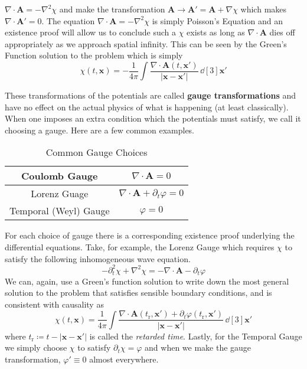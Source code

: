 \(\nabla\cdot\mathbf{A} = -\nabla^2\chi\) and make the transformation
\(\mathbf{A}\to\mathbf{A}'=\mathbf{A} + \nabla\chi\) which makes
\(\nabla\cdot\mathbf{A}' = 0\). The equation \(\nabla\cdot\mathbf{A} = -\nabla^2\chi\)
is simply Poisson's Equation and an existence proof will allow us to conclude
such a \(\chi\) exists as long as \(\nabla\cdot\mathbf{A}\) dies off
appropriately as we approach spatial infinity. This can be seen by the Green's
Function solution to the problem which is simply
\begin{equation*}
    \chi(t, \mathbf{x}) = -\frac{1}{4\pi}\int \frac{\nabla\cdot\mathbf{A}(t,\mathbf{x}')}{|\mathbf{x} - \mathbf{x}'|}\,\dd[3]{\mathbf{x}'}
\end{equation*}

These transformations of the potentials are called \textbf{gauge transformations}
and have no effect on the actual physics of what is happening (at least
classically). When one imposes an extra condition which the potentials must
satisfy, we call it choosing a gauge. Here are a few common examples.
\begin{table}[H]
    \centering
    \begin{tabular}{c c}
        Coulomb Gauge         & \(\nabla\cdot\mathbf{A} = 0\)                     \\ \midrule
        Lorenz Guage          & \(\nabla\cdot\mathbf{A} + \partial_t\varphi = 0\) \\ \midrule
        Temporal (Weyl) Gauge & \(\varphi = 0\)
    \end{tabular}
    \caption{Common Gauge Choices}\label{table:gauges}
\end{table}
For each choice of gauge there is a corresponding existence proof underlying the
differential equations. Take, for example, the Lorenz Gauge which requires
\(\chi\) to satisfy the following inhomogeneous wave equation.
\begin{equation*}
    -\partial_t^2\chi + \nabla^2\chi = -\nabla\cdot\mathbf{A} - \partial_t\varphi
\end{equation*}
We can, again, use a Green's function solution to write down the most general
solution to the problem that satisfies sensible boundary conditions, and is
consistent with causality as
\begin{equation*}
    \chi(t,\mathbf{x}) = \frac{1}{4\pi}\int \frac{\nabla\cdot\mathbf{A}(t_\text{r},\mathbf{x}') + \partial_t\varphi(t_\text{r},\mathbf{x}')}{\left|\mathbf{x} - \mathbf{x}'\right|}\,\dd[3]{\mathbf{x}'}
\end{equation*}
where \(t_\text{r}\coloneqq t - \left|\mathbf{x} - \mathbf{x}'\right|\) is
called the \textit{retarded time}.
Lastly, for the Temporal Gauge we simply choose \(\chi\) to satisfy
\(\partial_t\chi = \varphi\) and when we make the gauge transformation,
\(\varphi'\equiv 0\) almost everywhere.

